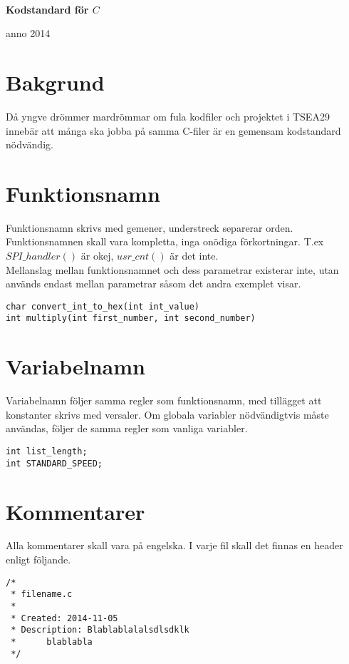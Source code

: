 \documentclass[titlepage, a4paper]{article}
\begin{document}
{\ }\vspace{5mm}

\centerline{\textbf{\Huge Kodstandard för $C$}}
\vspace{2mm}

\centerline{\LARGE anno 2014} %
\vspace{5mm}

\section{Bakgrund}
Då yngve drömmer mardrömmar om fula kodfiler och projektet i TSEA29 innebär att många ska jobba på samma C-filer är en gemensam kodstandard nödvändig.

\section{Funktionsnamn}
Funktionsnamn skrivs med gemener, understreck separerar orden. Funktionsnamnen skall vara kompletta, inga onödiga förkortningar. T.ex $SPI\_handler()$ är okej, $usr\_cnt()$ är det inte. \\
Mellanslag mellan funktionsnamnet och dess parametrar existerar inte, utan används endast mellan parametrar såsom det andra exemplet visar.

\begin{lstlisting}
char convert_int_to_hex(int int_value)
int multiply(int first_number, int second_number)
\end{lstlisting}

\section{Variabelnamn}
Variabelnamn följer samma regler som funktionsnamn, med tillägget att konstanter skrivs med versaler. Om globala variabler nödvändigtvis måste användas, följer de samma regler som vanliga variabler.

\begin{lstlisting}
int list_length;
int STANDARD_SPEED;
\end{lstlisting}

\section{Kommentarer}
Alla kommentarer skall vara på engelska. I varje fil skall det finnas en header enligt följande.

\begin{lstlisting}
/*
 * filename.c
 *
 * Created: 2014-11-05
 * Description: Blablablalalsdlsdklk
 * 		blablabla
 */
\end{lstlisting}
\end{document}
